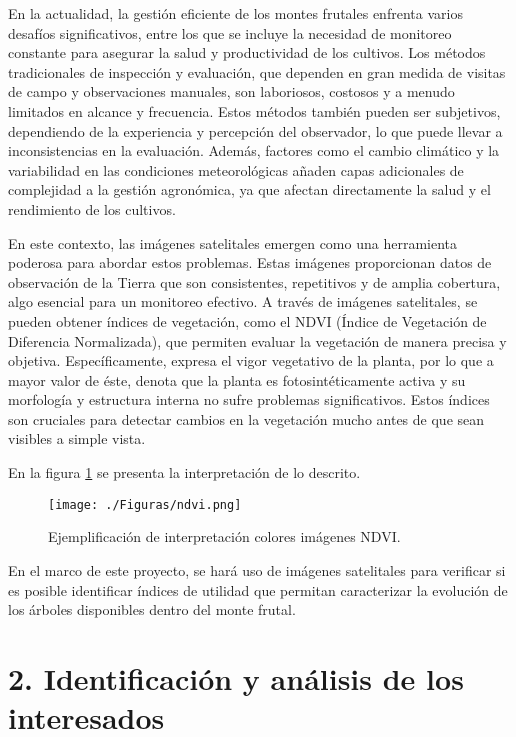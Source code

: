 \documentclass[
11pt, %
]{charter}
\begin{document}
En la actualidad, la gestión eficiente de los montes frutales enfrenta varios desafíos significativos, entre los que se incluye la necesidad 
de monitoreo constante para asegurar la salud y productividad de los cultivos. Los métodos tradicionales de inspección y evaluación, 
que dependen en gran medida de visitas de campo y observaciones manuales, son laboriosos, costosos y a menudo limitados en alcance y frecuencia. 
Estos métodos también pueden ser subjetivos, dependiendo de la experiencia y percepción del observador, lo que puede llevar a inconsistencias 
en la evaluación. Además, factores como el cambio climático y la variabilidad en las condiciones meteorológicas añaden capas adicionales de 
complejidad a la gestión agronómica, ya que afectan directamente la salud y el rendimiento de los cultivos.

En este contexto, las imágenes satelitales emergen como una herramienta poderosa para abordar estos problemas. Estas imágenes proporcionan datos 
de observación de la Tierra que son consistentes, repetitivos y de amplia cobertura, algo esencial para un monitoreo efectivo. 
A través de imágenes satelitales, se pueden obtener índices de vegetación, como el NDVI (Índice de Vegetación de Diferencia Normalizada), 
que permiten evaluar la vegetación de manera precisa y objetiva. Específicamente, expresa el vigor vegetativo de la planta, por lo que a mayor valor de éste, denota que la planta es fotosintéticamente 
activa y su morfología y estructura interna no sufre problemas significativos. Estos índices son cruciales para detectar cambios en la vegetación mucho antes 
de que sean visibles a simple vista. 

En la figura \ref{fig:ndvi} se presenta la interpretación de lo descrito.

\begin{figure}[htpb]
\centering 
\texttt{[image: ./Figuras/ndvi.png]}
\caption{Ejemplificación de interpretación colores imágenes NDVI.}
\label{fig:ndvi}
\end{figure}

\vspace{25px}

En el marco de este proyecto, se hará uso de imágenes satelitales para verificar si es posible identificar índices de utilidad
que permitan caracterizar la evolución de los árboles disponibles dentro del monte frutal. 

\pagebreak

\section{2. Identificación y análisis de los interesados}
\label{sec:interesados}
\end{document}
